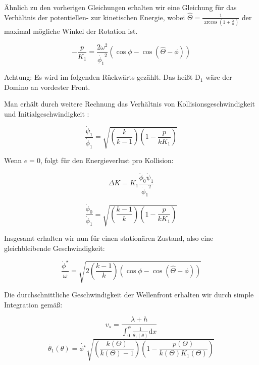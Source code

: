 Ähnlich zu den vorherigen Gleichungen erhalten wir eine Gleichung für das Verhältnis der potentiellen- zur kinetischen Energie, wobei $ \hat{\Theta} = \frac{1}{\arccos(1+\frac{\lambda}{h})} $ der maximal mögliche Winkel der Rotation ist.

\begin{equation}
    \label{eq:fracenergy2}
    -\frac{p}{K_1}=\frac{2\omega^2}{\dot{\phi_1}^2}(\cos\phi-\cos(\hat{\Theta}-\phi))
\end{equation}

Achtung: Es wird im folgenden Rückwärts gezählt. Das heißt $\mathrm{D}_1$ wäre der Domino an vordester Front.

Man erhält durch weitere Rechnung das Verhältnis von Kollisionsgeschwindigkeit und Initialgeschwindigkeit \cite{Stronge88}:

\begin{equation}
    \label{eq:fraccollision}
	\frac{\dot{\psi}_1}{\dot{\phi}_1} = \sqrt{(\frac{k}{k-1})(1-\frac{p}{kK_1})}
\end{equation}

Wenn $e=0$, folgt für den Energieverlust pro Kollision:

\begin{equation}
    \label{eq:energyloss2}
	\Delta K = K_1 \frac{\dot{\phi}_0 \dot{\psi}_1}{{\dot{\phi}_1}^2}
\end{equation}

\begin{equation}
	\label{eq:fracinitspeeds}
	\frac{\dot{\phi}_0}{\dot{\phi}_1} = \sqrt{(\frac{k-1}{k})(1-\frac{p}{kK_1})}
\end{equation}

Insgesamt erhalten wir nun für einen stationären Zustand, also eine gleichbleibende Geschwindigkeit: 

\begin{equation}
	\label{eq:phistar}
	\frac{\dot{\phi}^{\star}}{\omega} = \sqrt{2(\frac{k-1}{k})(\cos\phi-\cos(\hat{\Theta}-\phi))}
\end{equation}

Die durchschnittliche Geschwindigkeit der Wellenfront erhalten wir durch simple Integration \cite{Stronge88} gemäß:

\begin{equation}
    \label{eq:vel}
    v_{\star} = \frac{\lambda + h}{\int_0^{\psi} \frac{1}{\dot{\theta_1}(\theta)}\mathrm{d}x}
\end{equation}
\begin{equation}
    \label{eq:thetadot}
	\dot{\theta_1}(\theta) = \dot{\phi^{\star}} \sqrt{(\frac{k(\Theta)}{k(\Theta)-1})(1-\frac{p(\Theta)}{k(\Theta) K_{1}(\Theta)})}
\end{equation}

